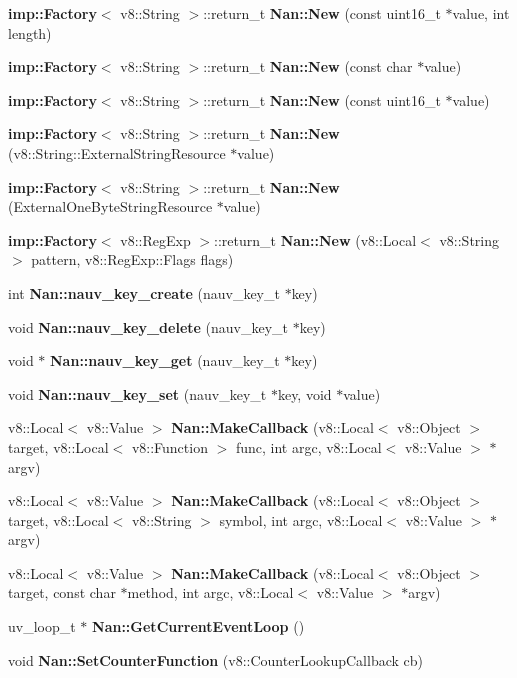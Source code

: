 \begin{DoxyCompactItemize}
\item 
\textbf{ imp\+::\+Factory}$<$ v8\+::\+String $>$\+::return\+\_\+t \textbf{ Nan\+::\+New} (const uint16\+\_\+t $\ast$value, int length)
\item 
\textbf{ imp\+::\+Factory}$<$ v8\+::\+String $>$\+::return\+\_\+t \textbf{ Nan\+::\+New} (const char $\ast$value)
\item 
\textbf{ imp\+::\+Factory}$<$ v8\+::\+String $>$\+::return\+\_\+t \textbf{ Nan\+::\+New} (const uint16\+\_\+t $\ast$value)
\item 
\textbf{ imp\+::\+Factory}$<$ v8\+::\+String $>$\+::return\+\_\+t \textbf{ Nan\+::\+New} (v8\+::\+String\+::\+External\+String\+Resource $\ast$value)
\item 
\textbf{ imp\+::\+Factory}$<$ v8\+::\+String $>$\+::return\+\_\+t \textbf{ Nan\+::\+New} (External\+One\+Byte\+String\+Resource $\ast$value)
\item 
\textbf{ imp\+::\+Factory}$<$ v8\+::\+Reg\+Exp $>$\+::return\+\_\+t \textbf{ Nan\+::\+New} (v8\+::\+Local$<$ v8\+::\+String $>$ pattern, v8\+::\+Reg\+Exp\+::\+Flags flags)
\item 
int \textbf{ Nan\+::nauv\+\_\+key\+\_\+create} (nauv\+\_\+key\+\_\+t $\ast$key)
\item 
void \textbf{ Nan\+::nauv\+\_\+key\+\_\+delete} (nauv\+\_\+key\+\_\+t $\ast$key)
\item 
void $\ast$ \textbf{ Nan\+::nauv\+\_\+key\+\_\+get} (nauv\+\_\+key\+\_\+t $\ast$key)
\item 
void \textbf{ Nan\+::nauv\+\_\+key\+\_\+set} (nauv\+\_\+key\+\_\+t $\ast$key, void $\ast$value)
\item 
v8\+::\+Local$<$ v8\+::\+Value $>$ \textbf{ Nan\+::\+Make\+Callback} (v8\+::\+Local$<$ v8\+::\+Object $>$ target, v8\+::\+Local$<$ v8\+::\+Function $>$ func, int argc, v8\+::\+Local$<$ v8\+::\+Value $>$ $\ast$argv)
\item 
v8\+::\+Local$<$ v8\+::\+Value $>$ \textbf{ Nan\+::\+Make\+Callback} (v8\+::\+Local$<$ v8\+::\+Object $>$ target, v8\+::\+Local$<$ v8\+::\+String $>$ symbol, int argc, v8\+::\+Local$<$ v8\+::\+Value $>$ $\ast$argv)
\item 
v8\+::\+Local$<$ v8\+::\+Value $>$ \textbf{ Nan\+::\+Make\+Callback} (v8\+::\+Local$<$ v8\+::\+Object $>$ target, const char $\ast$method, int argc, v8\+::\+Local$<$ v8\+::\+Value $>$ $\ast$argv)
\item 
uv\+\_\+loop\+\_\+t $\ast$ \textbf{ Nan\+::\+Get\+Current\+Event\+Loop} ()
\item 
void \textbf{ Nan\+::\+Set\+Counter\+Function} (v8\+::\+Counter\+Lookup\+Callback cb)

\end{DoxyCompactItemize}
